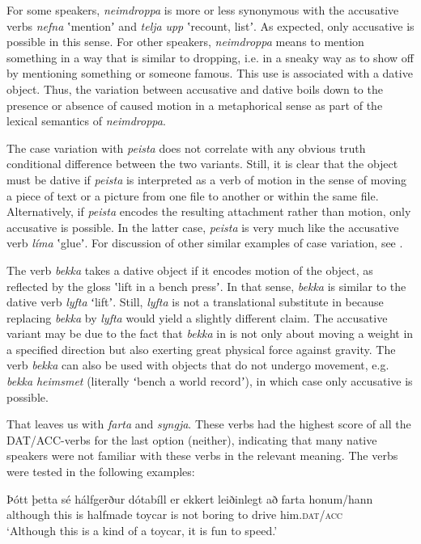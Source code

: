 \documentclass[output=paper,modfonts,nonflat,colorlinks,citecolor=brown]{langsci/langscibook}
\begin{document}
For some speakers, \textit{neimdroppa} is more or less synonymous with the accusative verbs \textit{nefna} ʽmentionʼ and \textit{telja} \textit{upp} ʽrecount, listʼ. As expected, only accusative is possible in this sense. For other speakers,  \textit{neimdroppa} means to mention something in a way that is similar to dropping, i.e. in a sneaky way as to show off by mentioning something or someone famous. This use is associated with a dative object. Thus, the variation between accusative and dative boils down to the presence or absence of caused motion in a metaphorical sense as part of the lexical semantics of \textit{neimdroppa}.

The case variation with \textit{peista} does not correlate with any obvious truth conditional difference between the two variants. Still, it is clear that the object must be dative if \textit{peista} is interpreted as a verb of motion in the sense of moving a piece of text or a picture from one file to another or within the same file. Alternatively, if \textit{peista} encodes the resulting attachment rather than motion, only accusative is possible. In the latter case, \textit{peista} is very much like the accusative verb \textit{líma} ʽglueʼ. For discussion of other similar examples of case variation, see \citet{Jónsson2013a}.

The verb \textit{bekka} takes a dative object if it encodes motion of the object, as reflected by the gloss ʽlift in a bench pressʼ. In that sense, \textit{bekka} is similar to the dative verb \textit{lyfta} ʻliftʼ. Still, \textit{lyfta} is not a translational substitute in  because replacing \textit{bekka} by \textit{lyfta} would yield a slightly different claim. The accusative variant may be due to the fact that \textit{bekka} in  is not only about moving a weight in a specified direction but also exerting great physical force against gravity. The verb \textit{bekka} can also be used with objects that do not undergo movement, e.g. \textit{bekka} \textit{heimsmet} (literally ʻbench a world recordʼ), in which case only accusative is possible. 

That leaves us with \textit{farta} and \textit{syngja}. These verbs had the highest score of all the DAT/ACC-verbs for the last option (neither), indicating that many native speakers were not familiar with these verbs in the relevant meaning. The verbs were tested in the following examples: 


\ea
    \label{ex:jonsson:8}
\ea%
\gll  Þótt  þetta  sé  hálfgerður  dótabíll  er  ekkert  leiðinlegt  að  farta  honum/hann\\
   although  this  is  halfmade  toycar  is  not  boring  to  drive  him.\textsc{dat/acc}\\
\glt `Although this is a kind of a toycar, it is fun to speed.'
\end{document}
